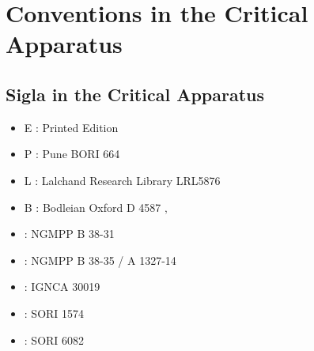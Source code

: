 \chapter{Conventions in the Critical Apparatus}
\section{Sigla in the Critical Apparatus}

\begin{itemize}
\item E : Printed Edition
\item P : Pune BORI 664
\item L : Lalchand Research Library LRL5876
\item B : Bodleian Oxford D 4587
‚\item \None : NGMPP B 38-31
\item \Ntwo : NGMPP B 38-35 / A 1327-14
\item \Done : IGNCA 30019
\item \Uone : SORI 1574
\item \Utwo: SORI 6082
\end{itemize}

